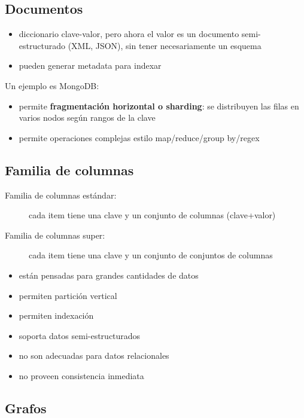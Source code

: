 \subsection{Documentos}

\begin{itemize}
	\item diccionario clave-valor, pero ahora el valor es un documento semi-estructurado (XML, JSON), sin tener necesariamente un esquema
	\item pueden generar metadata para indexar
\end{itemize}

Un ejemplo es MongoDB:

\begin{itemize}
	\item permite \textbf{fragmentación horizontal o sharding}: se distribuyen las filas en varios nodos según rangos de la clave
	\item permite operaciones complejas estilo map/reduce/group by/regex
\end{itemize}

\subsection{Familia de columnas}

\begin{description}
	\item[Familia de columnas estándar:] cada item tiene una clave y un conjunto de columnas (clave+valor)
	\item[Familia de columnas super:] cada item tiene una clave y un conjunto de conjuntos de columnas
\end{description}

\begin{itemize}
	\item están pensadas para grandes cantidades de datos
	\item permiten partición vertical
	\item permiten indexación
	\item soporta datos semi-estructurados
	\item no son adecuadas para datos relacionales
	\item no proveen consistencia inmediata
\end{itemize}

\subsection{Grafos}

